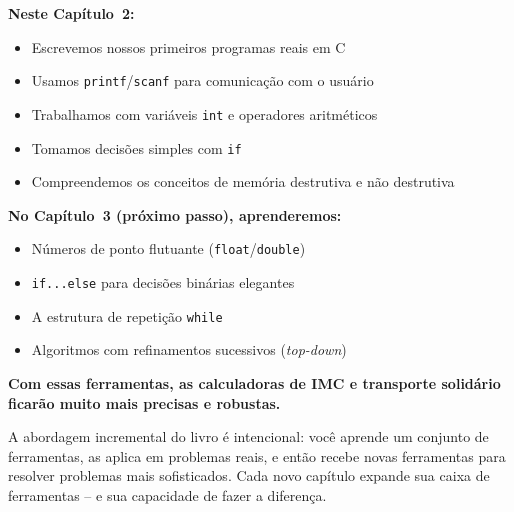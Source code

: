 \documentclass[12pt,a4paper]{article}
\begin{document}
\begin{tcolorbox}[colback=deitellightblue,colframe=deitelblue,
  title={\bfseries O que aprendemos e o que está por vir}]

\textbf{Neste Capítulo~2:}
\begin{itemize}[noitemsep]
  \item Escrevemos nossos primeiros programas reais em C
  \item Usamos \texttt{printf}/\texttt{scanf} para comunicação com o usuário
  \item Trabalhamos com variáveis \texttt{int} e operadores aritméticos
  \item Tomamos decisões simples com \texttt{if}
  \item Compreendemos os conceitos de memória destrutiva e não destrutiva
\end{itemize}

\medskip\textbf{No Capítulo~3 (próximo passo), aprenderemos:}
\begin{itemize}[noitemsep]
  \item Números de ponto flutuante (\texttt{float}/\texttt{double})
  \item \texttt{if...else} para decisões binárias elegantes
  \item A estrutura de repetição \texttt{while}
  \item Algoritmos com refinamentos sucessivos (\textit{top-down})
\end{itemize}

\medskip\textbf{Com essas ferramentas, as calculadoras de IMC e transporte solidário
ficarão muito mais precisas e robustas.}

\begin{boaprática}
  A abordagem incremental do livro é intencional: você aprende um conjunto
  de ferramentas, as aplica em problemas reais, e então recebe novas ferramentas
  para resolver problemas mais sofisticados. Cada novo capítulo expande sua
  caixa de ferramentas -- e sua capacidade de fazer a diferença.
\end{boaprática}

\end{tcolorbox}
\end{document}
